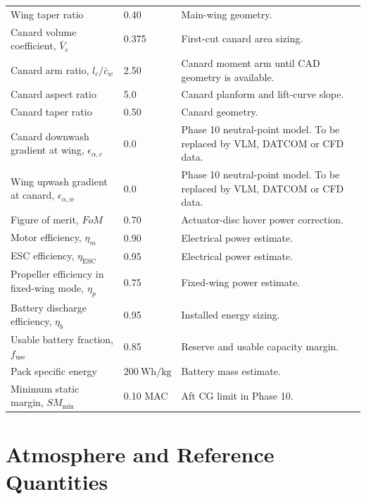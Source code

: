 \begin{longtable}{@{}p{}p{}p{}@{}}
Wing taper ratio & 0.40 & Main-wing geometry. \\
Canard volume coefficient, \(\bar{V}_c\) & 0.375 & First-cut canard area sizing. \\
Canard arm ratio, \(l_c/\bar{c}_w\) & 2.50 & Canard moment arm until CAD geometry is available. \\
Canard aspect ratio & 5.0 & Canard planform and lift-curve slope. \\
Canard taper ratio & 0.50 & Canard geometry. \\
Canard downwash gradient at wing, \(\epsilon_{\alpha,c}\) & 0.0 & Phase 10 neutral-point model. To be replaced by VLM, DATCOM or CFD data. \\
Wing upwash gradient at canard, \(\epsilon_{\alpha,w}\) & 0.0 & Phase 10 neutral-point model. To be replaced by VLM, DATCOM or CFD data. \\
Figure of merit, \(FoM\) & 0.70 & Actuator-disc hover power correction. \\
Motor efficiency, \(\eta_m\) & 0.90 & Electrical power estimate. \\
ESC efficiency, \(\eta_{\mathrm{ESC}}\) & 0.95 & Electrical power estimate. \\
Propeller efficiency in fixed-wing mode, \(\eta_p\) & 0.75 & Fixed-wing power estimate. \\
Battery discharge efficiency, \(\eta_b\) & 0.95 & Installed energy sizing. \\
Usable battery fraction, \(f_{\mathrm{use}}\) & 0.85 & Reserve and usable capacity margin. \\
Pack specific energy & \(200~\mathrm{Wh/kg}\) & Battery mass estimate. \\
Minimum static margin, \(SM_{\min}\) & 0.10 MAC & Aft CG limit in Phase 10. \\
\end{longtable}

\section{Atmosphere and Reference Quantities}
\label{sec:ppa_atmosphere}

